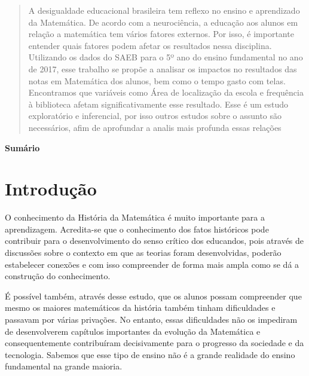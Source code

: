 \documentclass[a4paper, 12pt]{article} %
\makeatletter
\renewcommand\tableofcontents{
  \null\hfill\textbf{\Large\contentsname}\hfill\null\par
  \@mkboth{\MakeUppercase\contentsname}{\MakeUppercase\contentsname}%
  \@starttoc{toc}}
\renewcommand{\contentsname}{Sumário}
\makeatother
\begin{document}








\newpage

\begin{abstract}
    A desigualdade educacional brasileira tem reflexo no ensino e aprendizado da Matemática. De acordo com a neurociência, a educação aos alunos em relação a matemática tem vários fatores externos. Por isso, é importante entender quais fatores podem afetar os resultados nessa disciplina. Utilizando os dados do SAEB para o 5º ano do ensino fundamental no ano de 2017, esse trabalho se propõe a analisar os impactos no resultados das notas em Matemática dos alunos, bem como o tempo gasto com telas. Encontramos que variáveis como Área de localização da escola e frequência à biblioteca afetam significativamente esse resultado. Esse é um estudo exploratório e inferencial, por isso outros estudos sobre o assunto são necessários, afim de aprofundar a analis mais profunda essas relações
\end{abstract}
\tableofcontents
\thispagestyle{empty}

\newpage

\section{Introdução}

O conhecimento da História da Matemática é muito importante para a aprendizagem. Acredita-se que o conhecimento dos fatos históricos pode contribuir para o desenvolvimento do senso crítico dos educandos, pois através de discussões sobre o contexto em que as teorias foram desenvolvidas, poderão estabelecer conexões e com isso compreender de forma mais ampla como se dá a construção do conhecimento. 

É possível também, através desse estudo, que os alunos possam compreender que mesmo os maiores matemáticos da história também tinham dificuldades e passavam por várias privações. No entanto, essas dificuldades não os impediram de desenvolverem capítulos importantes da evolução da Matemática e consequentemente contribuíram decisivamente para o progresso da sociedade e da tecnologia. Sabemos que esse tipo de ensino não é a grande realidade do ensino fundamental na grande maioria. 
\end{document}
